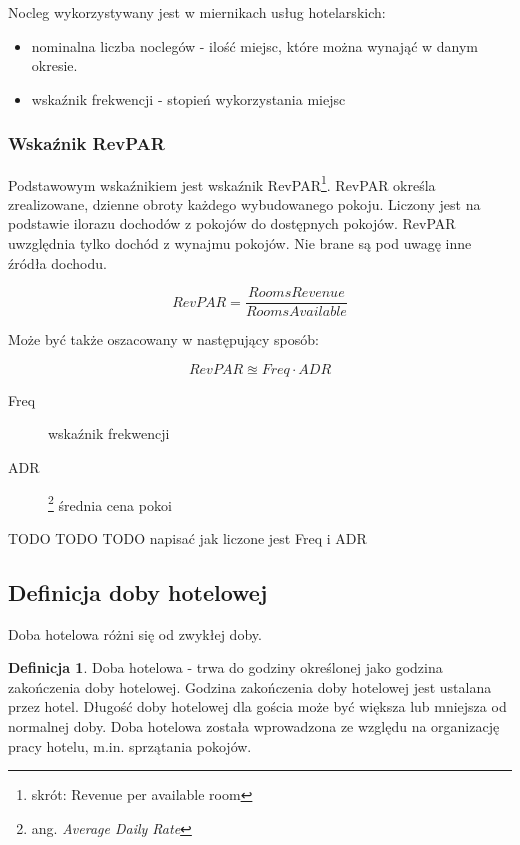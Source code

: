 \documentclass[a4paper,onecolumn,oneside,11pt,wide,floatssmall]{mwrep}
\theoremstyle{definition}
\newtheorem{defn}{Definicja}[section]
\theoremstyle{plain}%
\theoremstyle{remark}
\begin{document}
Nocleg wykorzystywany jest w miernikach usług hotelarskich:
\begin{itemize}
  \item nominalna liczba noclegów - ilość miejsc, które można wynająć w danym okresie.
  \item wskaźnik frekwencji - stopień wykorzystania miejsc
\end{itemize}

\subsubsection{Wskaźnik RevPAR}
Podstawowym wskaźnikiem jest wskaźnik RevPAR\footnote{skrót: Revenue per available room}. RevPAR określa zrealizowane, 
dzienne obroty każdego wybudowanego pokoju. Liczony jest na podstawie
 ilorazu dochodów z pokojów do dostępnych pokojów. RevPAR uwzględnia tylko 
 dochód z wynajmu pokojów. Nie brane są pod uwagę inne źródła dochodu.

\begin{equation}
RevPAR = \frac{Rooms Revenue}{Rooms Available}
\end{equation}

Może być także oszacowany w następujący sposób:

\begin{equation}
RevPAR \approxeq Freq \cdot ADR
\end{equation}

\begin{description}
  \item[Freq] wskaźnik frekwencji
  \item[ADR]\footnote{ang. {\em Average Daily Rate} } średnia cena pokoi

\end{description}

TODO TODO TODO napisać jak liczone jest Freq i ADR

\subsection{Definicja doby hotelowej}
Doba hotelowa różni się od zwykłej doby.

\begin{defn}{Doba hotelowa} - trwa do godziny określonej jako godzina zakończenia doby 
hotelowej. Godzina zakończenia doby hotelowej jest ustalana przez hotel.
 Długość doby hotelowej dla gościa może być większa lub mniejsza 
od normalnej doby. Doba hotelowa została wprowadzona ze względu na 
organizację pracy hotelu, m.in. sprzątania pokojów.

\end{defn}
\end{document}

